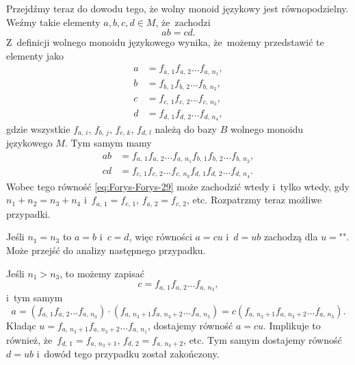 \documentclass[a4paper,11pt]{article}
\begin{document}
Przejdźmy teraz do dowodu tego, że wolny monoid językowy jest
równopodzielny. Weźmy takie elementy $a, b, c, d \in M$, że~zachodzi
\begin{equation}
  \label{eq:Forys-Forys-29}
  a b = c d.
\end{equation}
Z~definicji wolnego monoidu językowego wynika, że~możemy przedstawić te
elementy jako
\begin{subequations}
  \begin{align}
    \label{eq:Forys-Forys-30-A}
    a &= f_{ a,\, 1 } f_{ a,\, 2 } \ldots f_{ a,\, n_{ 1 } }, \\
    \label{eq:Forys-Forys-30-B}
    b &= f_{ b,\, 1 } f_{ b,\, 2 } \ldots f_{ b,\, n_{ 2 } }, \\
    \label{eq:Forys-Forys-30-C}
    c &= f_{ c,\, 1 } f_{ c,\, 2 } \ldots f_{ c,\, n_{ 3 } }, \\
    \label{eq:Forys-Forys-30-D}
    d &= f_{ d,\, 1 } f_{ d,\, 2 } \ldots f_{ d,\, n_{ 4 } },
  \end{align}
\end{subequations}
gdzie wszystkie $f_{ a,\, i }$, $f_{ b,\, j }$, $f_{ c,\, k }$, $f_{ d,\, l }$
należą do bazy $B$ wolnego monoidu językowego $M$. Tym samym mamy
\begin{subequations}
  \begin{align}
    \label{eq:Forys-Forys-31-A}
    a b
    &=
      f_{ a,\, 1 } f_{ a,\, 2 } \ldots f_{ a,\, n_{ 1 } } f_{ b,\, 1 }
      f_{ b,\, 2 } \ldots f_{ b,\, n_{ 2 } }, \\
    \label{eq:Forys-Forys-31-B}
    cd
    &=
      f_{ c,\, 1 } f_{ c,\, 2 } \ldots f_{ c,\, n_{ 3 } } f_{ d,\, 1 }
      f_{ d,\, 2 } \ldots f_{ d,\, n_{ 4 } }.
  \end{align}
\end{subequations}
Wobec tego równość \eqref{eq:Forys-Forys-29} może zachodzić wtedy i~tylko
wtedy, gdy $n_{ 1 } + n_{ 2 } = n_{ 3 } + n_{ 4 }$ i~$f_{ a,\, 1 } = f_{ c,\, 1 }$,
$f_{ a,\, 2 } = f_{ c,\, 2 }$, etc. Rozpatrzmy teraz możliwe przypadki.

Jeśli $n_{ 1 } = n_{ 3 }$ to $a = b$ i~$c = d$, więc równości $a = cu$
i~$d = ub$ zachodzą dla $u = \texttt{""}$. Może przejść do analizy
następnego przypadku.

Jeśli $n_{ 1 } > n_{ 3 }$, to możemy zapisać
\begin{equation}
  \label{eq:Forys-Forys-32}
  c = f_{ a,\, 1 } f_{ a,\, 2 } \ldots f_{ a,\, n_{ 3 } },
\end{equation}
i~tym samym
\begin{equation}
  \label{eq:Forys-Forys-33}
  a =
  ( f_{ a,\, 1 } f_{ a,\, 2 } \ldots f_{ a,\, n_{ 3 } } ) \cdot ( f_{ a,\, n_{ 3 } + 1 }
  f_{ a,\, n_{ 3 } + 2 } \ldots f_{ a,\, n_{ 3 } } )
  =
  c ( f_{ a,\, n_{ 3 } + 1 } f_{ a,\, n_{ 3 } + 2 } \ldots f_{ a,\, n_{ 3 } } ).
\end{equation}
Kładąc $u = f_{ a,\, n_{ 3 } + 1 } f_{ a,\, n_{ 3 } + 2 } \ldots f_{ a,\, n_{ 1 } }$,
dostajemy równość $a = cu$. Implikuje to również,
że~$f_{ d,\, 1 } = f_{ a,\, n_{ 3 } + 1 }$, $f_{ d,\, 2 } = f_{ a,\, n_{ 3 } + 2 }$,
etc. Tym samym dostajemy równość $d = ub$ i~dowód tego przypadku został
zakończony.
\end{document}
